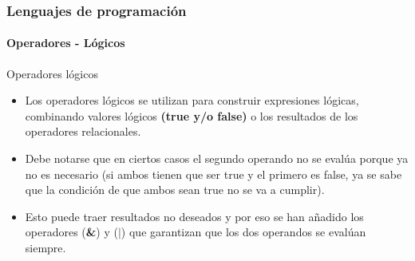 \documentclass{beamer}
\begin{document}
\begin{frame}
  \frametitle{Lenguajes de programación} 
  \framesubtitle{Operadores - Lógicos}

  \begin{block}{Operadores lógicos}
    \begin{itemize}
    \item Los operadores lógicos se utilizan para construir expresiones lógicas, combinando valores lógicos \textbf{(true y/o false)} o los resultados de los operadores relacionales. 
    \item Debe notarse que en ciertos casos el segundo operando no se evalúa porque ya no es necesario (si ambos tienen que ser true y el primero es false, ya se sabe que la condición de que ambos sean true no se va a cumplir). 
    \item Esto puede traer resultados no deseados y por eso se han a\~nadido los operadores (\textbf{\&}) y (\textbf{$\mid$}) que garantizan que los dos operandos se evalúan siempre.
    \end{itemize}
  \end{block}
\end{frame}
\end{document}
